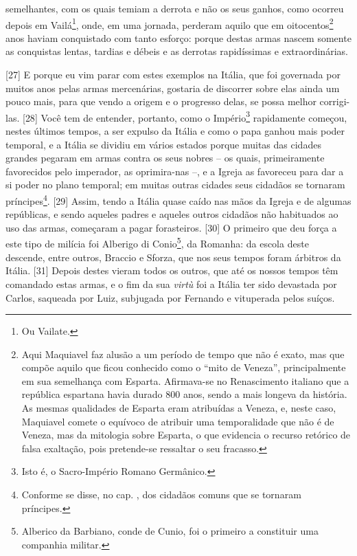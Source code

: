 semelhantes, com os quais temiam a derrota e não os seus ganhos, como
ocorreu depois em Vailá\footnote{Ou Vailate.}, onde, em uma jornada,
perderam aquilo que em oitocentos\footnote{Aqui Maquiavel faz alusão a
  um período de tempo que não é exato, mas que compõe aquilo que ficou
  conhecido como o ``mito de Veneza'', principalmente em sua semelhança
  com Esparta. Afirmava-se no Renascimento italiano que a república
  espartana havia durado 800 anos, sendo a mais longeva da história. As
  mesmas qualidades de Esparta eram atribuídas a Veneza, e, neste caso,
  Maquiavel comete o equívoco de atribuir uma temporalidade que não é de
  Veneza, mas da mitologia sobre Esparta, o que evidencia o recurso
  retórico de falsa exaltação, pois pretende-se ressaltar o seu
  fracasso.} anos haviam conquistado com tanto esforço: porque destas
armas nascem somente as conquistas lentas, tardias e débeis e as
derrotas rapidíssimas e extraordinárias.

{[}27{]} E porque eu vim parar com estes exemplos na Itália, que foi
governada por muitos anos pelas armas mercenárias, gostaria de discorrer
sobre elas ainda um pouco mais, para que vendo a origem e o progresso
delas, se possa melhor corrigi-las. {[}28{]} Você tem de entender,
portanto, como o Império\footnote{Isto é, o Sacro-Império Romano
  Germânico.} rapidamente começou, nestes últimos tempos, a ser expulso
da Itália e como o papa ganhou mais poder temporal, e a Itália se
dividiu em vários estados porque muitas das cidades grandes pegaram em
armas contra os seus nobres -- os quais, primeiramente favorecidos pelo
imperador, as oprimira-nas --, e a Igreja as favoreceu para dar a si
poder no plano temporal; em muitas outras cidades seus cidadãos se
tornaram príncipes\footnote{Conforme se disse, no cap. , dos cidadãos
  comuns que se tornaram príncipes.}. {[}29{]} Assim, tendo a Itália
quase caído nas mãos da Igreja e de algumas repúblicas, e sendo aqueles
padres e aqueles outros cidadãos não habituados ao uso das armas,
começaram a pagar forasteiros. {[}30{]} O primeiro que deu força a este
tipo de milícia foi Alberigo di Conio\footnote{Alberico da Barbiano,
  conde de Cunio, foi o primeiro a constituir uma companhia militar.},
da Romanha: da escola deste descende, entre outros, Braccio e Sforza,
que nos seus tempos foram árbitros da Itália. {[}31{]} Depois destes
vieram todos os outros, que até os nossos tempos têm comandado estas
armas, e o fim da sua \emph{virtù} foi a Itália ter sido devastada por
Carlos, saqueada por Luiz, subjugada por Fernando e vituperada pelos
suíços.


